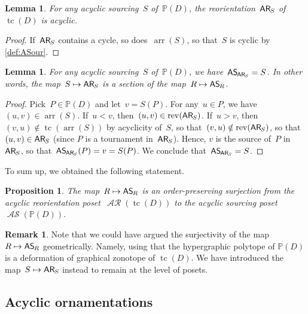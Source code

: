 \documentclass{amsart}
\newtheorem{proposition}[theorem]{Proposition}
\newtheorem{lemma}[theorem]{Lemma}
\theoremstyle{definition}
\newtheorem{remark}[theorem]{Remark}
\renewcommand{\c}[1]{\mathcal{#1}} %
\DeclareMathOperator{\tc}{tc} %
\newcommand{\mymap}[2]{\mathsf{#1}_{\hspace{-.7pt}#2}}
\DeclareMathOperator{\AReori}{\c{AR}}  %
\newcommand{\areori}[1]{\mymap{AR}{#1}}  %
\DeclareMathOperator{\rev}{rev} %
\DeclareMathOperator{\ASour}{\mathcal{AS}}  %
\newcommand{\asour}[1]{\mymap{AS}{#1}}  %
\DeclareMathOperator{\arr}{arr} %
\newcommand{\PP}{\mathbb P} %
\begin{document}
\begin{lemma}
\label{lem:ASour2AReori1}
For any acyclic sourcing~$S$ of~$\PP(D)$, the reorientation~$\areori{S}$ of~$\tc(D)$ is acyclic.
\end{lemma}

\begin{proof}
If~$\areori{S}$ contains a cycle, so does~$\arr(S)$, so that~$S$ is cyclic by \cref{def:ASour}.
\end{proof}

\begin{lemma}
\label{lem:ASour2AReori2}
For any acyclic sourcing~$S$ of~$\PP(D)$, we have~$\asour{\areori{S}} = S$. In other words, the map~$S \mapsto \areori{S}$ is a section of the map~$R \mapsto \asour{R}$.
\end{lemma}

\begin{proof}
Pick~$P \in \PP(D)$ and let~$v = S(P)$.
For any~$u \in P$, we have~$(u,v) \in \arr(S)$.
If~$u < v$, then~$(u,v) \in \rev(\areori{S})$.
If~$u > v$, then~$(v,u) \notin \tc(\arr(S))$ by acyclicity of~$S$, so that~$(v,u) \notin \rev(\areori{S})$, so that~$(u,v) \in \areori{S}$ (since $P$ is a tournament in~$\areori{S}$).
Hence, $v$ is the source of~$P$ in~$\areori{S}$, so that~$\asour{\areori{S}}(P) = v = S(P)$.
We conclude that~$\asour{\areori{S}} = S$. 
\end{proof}

To sum up, we obtained the following statement.

\begin{proposition}
\label{prop:AReori2ASour}
The map~$R \mapsto \asour{R}$ is an order-preserving surjection from the acyclic reorientation poset~$\AReori(\tc(D))$ to the acyclic sourcing poset~$\ASour(\PP(D))$.
\end{proposition}

\begin{remark}
Note that we could have argued the surjectivity of the map~$R \mapsto \asour{R}$ geometrically.
Namely, using that the hypergraphic polytope of $\PP(D)$ is a deformation of graphical zonotope of $\tc(D)$.
We have introduced the map~$S \mapsto \areori{S}$ instead to remain at the level of posets.
\end{remark}


\subsection{Acyclic ornamentations}
\label{subsec:acyclicOrnamentations}
\end{document}
